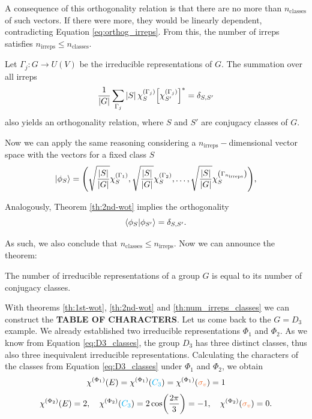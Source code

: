 A consequence of this orthogonality relation is that there are no more than $n_{\text{classes}}$ of such vectors. If there were more, they would be linearly dependent, contradicting Equation \ref{eq:orthog_irreps}. From this, the number of irreps satisfies $n_{\text{irreps}} \leq n_{\text{classes}}$.

\begin{theorem} \label{th:2nd-wot}
Let $\Gamma_j: G \to U(V)$ be the irreducible representations of $G$. The summation over all irreps
\begin{equation} \label{eq:2nd-wot}
\frac{1}{\abs{G}} \sum_{\Gamma_j} \abs{S} \, \chi^{(\Gamma_j)}_S \qty[\chi^{(\Gamma_j)}_{S'}]^* = \delta_{S, S'}
\end{equation}
also yields an orthogonality relation, where $S$ and $S'$ are conjugacy classes of $G$.
\end{theorem}

Now we can apply the same reasoning considering a $n_{\text{irreps}}-$dimensional vector space with the vectors for a fixed class $S$
$$
\ket{\phi_{S}} =
\qty(
\sqrt{\frac{\abs{S}}{\abs{G}}} \chi^{(\Gamma_1)}_{S},
\sqrt{\frac{\abs{S}}{\abs{G}}} \chi^{(\Gamma_2)}_{S},
\ldots,
\sqrt{\frac{\abs{S}}{\abs{G}}} \chi^{\qty(\Gamma_{n_{\text{irreps}}})}_{S}
),
$$

Analogously, Theorem \ref{th:2nd-wot} implies the orthogonality
$$
\braket{\phi_{S}}{\phi_{S'}} = \delta_{S, S'}.
$$

As such, we also conclude that $n_{\text{classes}} \leq n_{\text{irreps}}$. Now we can announce the theorem:

\begin{theorem}[$\bm{n_{\textbf{irreps}} = n_{\textbf{classes}}}$] \label{th:num_irreps_classes}
The number of irreducible representations of a group $G$ is equal to its number of conjugacy classes.
\end{theorem}

With theorems \ref{th:1st-wot}, \ref{th:2nd-wot} and \ref{th:num_irreps_classes} we can construct the \textbf{TABLE OF CHARACTERS}. Let us come back to the $G = D_3$ example. We already established two irreducible representations $\Phi_1$ and $\Phi_2$. As we know from Equation \ref{eq:D3_classes}, the group $D_3$ has three distinct classes, thus also three inequivalent irreducible representations. Calculating the characters of the classes from Equation \ref{eq:D3_classes} under $\Phi_1$ and $\Phi_2$, we obtain
$$
\chi^{(\Phi_1)}(E) = \chi^{(\Phi_1)}(\Ct) = \chi^{(\Phi_1)}(\sv) = 1
$$
$$
\chi^{(\Phi_2)}(E) = 2, \quad \chi^{(\Phi_2)}(\Ct) = 2 \cos(\frac{2\pi}{3}) = -1, \quad \chi^{(\Phi_2)}(\sv) = 0.
$$

